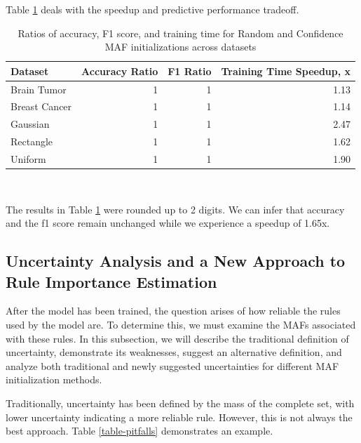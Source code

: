 \documentclass[10pt,a4paper,oneside]{article}
\begin{document}
\newpage
Table \ref{table-ratios} deals with the speedup and predictive performance tradeoff. \\

\begin{table}[htbp]
    \centering
    \begin{tabular}{l|r|r|r}
    \toprule
    Dataset & Accuracy Ratio & F1 Ratio & Training Time Speedup, x \\
    \midrule
Brain Tumor & 1 & 1 & 1.13 \\
Breast Cancer & 1 & 1 & 1.14 \\
Gaussian & 1 & 1 & 2.47 \\
Rectangle & 1 & 1 & 1.62 \\
Uniform & 1 & 1 & 1.90 \\
    \bottomrule
    \end{tabular} \\
    \caption{Ratios of accuracy, F1 score, and training time for Random and Confidence MAF initializations across datasets}
    \label{table-ratios}
\end{table}

The results in Table \ref{table-ratios} were rounded up to 2 digits. We can infer that accuracy and the f1 score remain unchanged while we experience a speedup of 1.65x.


\subsection{Uncertainty Analysis and a New Approach to Rule Importance Estimation}\label{sec:uncertainty-analysis}
After the model has been trained, the question arises of how reliable the rules used by the model are. To determine this, we must examine the MAFs associated with these rules. In this subsection, we will describe the traditional definition of uncertainty, demonstrate its weaknesses, suggest an alternative definition, and analyze both traditional and newly suggested uncertainties for different MAF initialization methods.

Traditionally, uncertainty has been defined by the mass of the complete set, with lower uncertainty indicating a more reliable rule. However, this is not always the best approach. Table \ref{table-pitfalls} demonstrates an example. 
\end{document}
